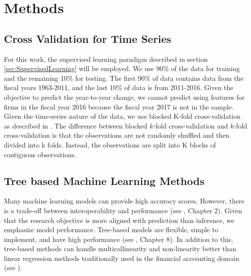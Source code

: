 \section{Methods}

\subsection{Cross Validation for Time Series} \label{sec:CV-TS}

For this work, the supervised learning paradigm described in section \ref{sec:SupervisedLearning} will be employed.  We use 90\% of the data for training and the remaining 10\% for testing. The first 90\% of data contains data from the fiscal years 1963-2011, and the last 10\% of data is from 2011-2016.  Given the objective to predict the year-to-year change, we cannot predict using features for firms in the fiscal year 2016 because the fiscal year 2017 is not in the sample. Given the time-series nature of the data, we use blocked K-fold cross-validation as described in \cite{cerqueira2019evaluating}. The difference between blocked \(k\)-fold cross-validation and \(k\)-fold cross-validation is that the observations are not randomly shuffled and then divided into k folds. Instead, the observations are split into K blocks of contiguous observations. 


\subsection{Tree based Machine Learning Methods}

Many machine learning models can provide high accuracy scores. However, there is a trade-off between interoperability and performance (see  \cite{ISL}, Chapter 2).  Given that the research objective is more aligned with prediction than inference, we emphasize model performance. Tree-based models are flexible, simple to implement, and have high performance (see \cite{ISL},  Chapter 8). In addition to this, tree-based methods can handle multicollinearity and non-linearity better than linear regression methods traditionally used in the financial accounting domain (see \cite{Monahan}).  

